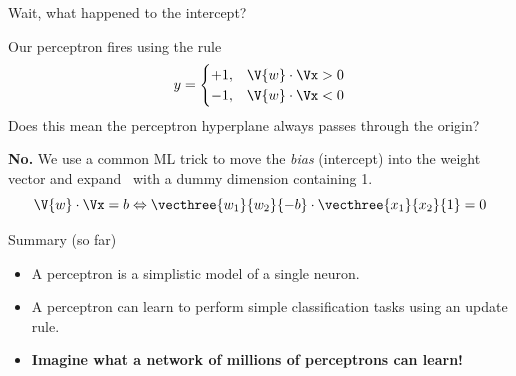 \documentclass[9pt]{beamer}
\begin{document}
\begin{frame}{Wait, what happened to the intercept?}

Our perceptron fires using the rule
\[ y = \begin{cases} +1, & \V{w}\cdot\Vx > 0 \\ -1, & \V{w}\cdot\Vx < 0 \end{cases} \]
Does this mean the perceptron hyperplane always passes through the origin?

\bigskip
\pause
\textbf{No.} We use a common ML trick to move the \emph{bias} (intercept) into the weight vector and expand \Vx\ with a dummy dimension containing 1.
\[ \V{w}\cdot\Vx = b \Leftrightarrow \vecthree{w_1}{w_2}{-b}\cdot\vecthree{x_1}{x_2}{1} = 0 \]

	
\end{frame}

\begin{frame}{Summary (so far)}

\begin{itemize}
	\item A perceptron is a simplistic model of a single neuron.
	\item A perceptron can learn to perform simple classification tasks using an update rule.
	\item<2-> \textbf{Imagine what a network of millions of perceptrons can learn!}
\end{itemize}
	
\end{frame}
\end{document}
